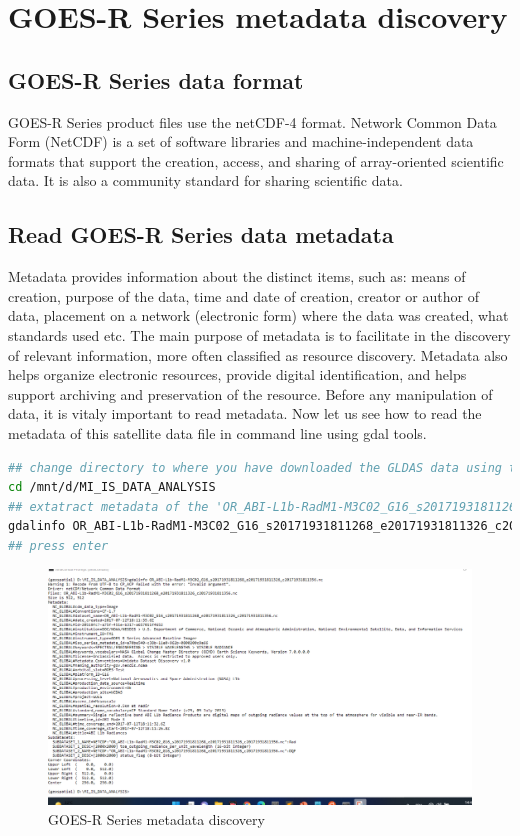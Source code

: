 \section{GOES-R Series metadata discovery}
\subsection{ GOES-R Series data format}
GOES-R Series product files use the netCDF-4 format.
Network Common Data Form (NetCDF) is a set of software libraries and machine-independent data formats that support the creation, access, and sharing of array-oriented scientific data. It is also a community standard for sharing scientific data.
\subsection{Read GOES-R Series data metadata}
Metadata provides information about the distinct items, such as: means of creation, purpose of 
the data, time and date of creation, creator or author of data, placement on a network (electronic 
form) where the data was created, what standards used etc.
The main purpose of metadata is to facilitate in the discovery of relevant information, more often 
classified as resource discovery. Metadata also helps organize electronic resources, provide 
digital identification, and helps support archiving and preservation of the resource.
Before any manipulation of data, it is vitaly important to read metadata.
Now let us see how to read the metadata of this satellite data file in command line using gdal tools.
\begin{lstlisting}[language=Bash]
## change directory to where you have downloaded the GLDAS data using the below
cd /mnt/d/MI_IS_DATA_ANALYSIS
## extatract metadata of the 'OR_ABI-L1b-RadM1-M3C02_G16_s20171931811268_e20171931811326_c20171931811356.nc' 
gdalinfo OR_ABI-L1b-RadM1-M3C02_G16_s20171931811268_e20171931811326_c20171931811356.nc
## press enter
\end{lstlisting}
\begin{figure}[H]
\begin{center}
\includegraphics[scale=0.5]{gdal1.png} %
\end{center}
\caption{GOES-R Series metadata discovery}
\label{GOES-R Series metadata discovery}%
\end{figure}

